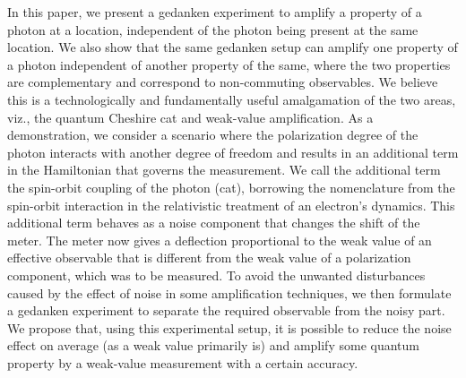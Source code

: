 \documentclass[aps,pra,showpacs,twoside,twocolumn,10pt]{revtex4-1}
\begin{document}
In this paper, we present a gedanken experiment to amplify a property of a photon at a location, independent of the photon being present at the same location. We also show that the same gedanken setup can amplify one property of a photon independent of another property of the same, where the two properties are complementary and correspond to  non-commuting observables.
We believe this is a technologically and fundamentally useful  amalgamation of the two areas, viz., the quantum Cheshire cat and weak-value amplification.
As a demonstration, we consider a scenario where the polarization degree of the photon interacts with another degree of freedom and results in an additional term in the Hamiltonian that governs the measurement. We call the additional term 
the
spin-orbit coupling of the photon (cat), borrowing the nomenclature from the spin-orbit interaction in the relativistic treatment of an electron's dynamics. This additional term behaves as a noise component that changes the shift of the meter. The meter now gives a deflection proportional to the weak value of an effective observable that is different from the weak value of a polarization component, which was to be measured. To avoid the unwanted disturbances caused by the effect of noise in some amplification techniques, we then formulate a gedanken experiment to separate the required observable from the noisy part. We propose that, using this experimental setup, it is possible to reduce the noise effect on average (as a weak value primarily is) and amplify some quantum property by a weak-value measurement with a certain accuracy. 
\end{document}
